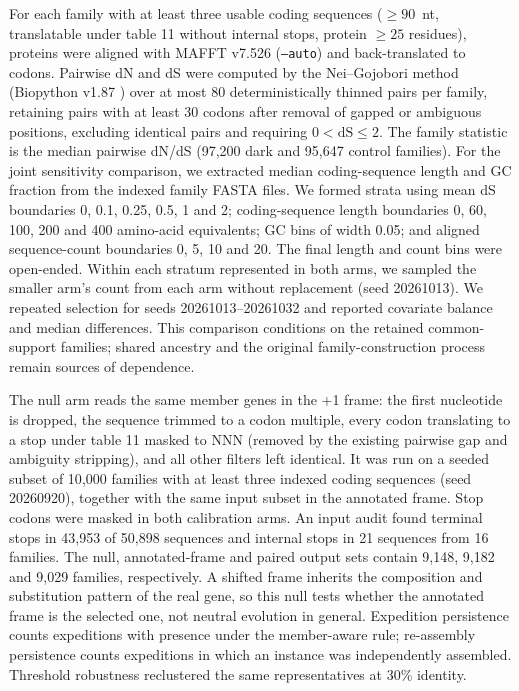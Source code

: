 \documentclass[11pt]{article}
\begin{document}
For each family with at least three usable coding sequences ($\geq 90$~nt, translatable under table
11 without internal stops, protein $\geq 25$ residues), proteins were aligned with MAFFT v7.526
(\texttt{--auto}) \citep{katoh2013mafft} and back-translated to codons. Pairwise dN and dS were computed
by the Nei--Gojobori method \citep{nei1986dnds} (Biopython v1.87 \citep{cock2009biopython}) over at most
80 deterministically thinned pairs per family, retaining pairs with at least 30 codons after removal
of gapped or ambiguous positions, excluding identical pairs and requiring $0 < \mathrm{dS} \leq 2$.
The family statistic is the median pairwise dN/dS (97{,}200 dark and 95{,}647 control families).
For the joint sensitivity comparison, we extracted median coding-sequence length and GC
fraction from the indexed family FASTA files. We formed strata using mean dS boundaries
0, 0.1, 0.25, 0.5, 1 and 2; coding-sequence length boundaries 0, 60, 100, 200 and 400 amino-acid
equivalents; GC bins of width 0.05; and aligned sequence-count boundaries 0, 5, 10 and 20.
The final length and count bins were open-ended. Within each stratum represented in both arms,
we sampled the smaller arm's count from each arm without replacement (seed 20261013).
We repeated selection for seeds 20261013--20261032 and reported covariate balance and median
differences. This comparison conditions on the retained common-support families; shared ancestry
and the original family-construction process remain sources of dependence.

The null arm reads the same member genes in the +1 frame: the first nucleotide is dropped, the
sequence trimmed to a codon multiple, every codon translating to a stop under table 11 masked to NNN
(removed by the existing pairwise gap and ambiguity stripping), and all other filters left identical.
It was run on a seeded subset of 10{,}000 families with at least three indexed coding
sequences (seed 20260920), together with the same input subset in the annotated frame. Stop
codons were masked in both calibration arms. An input audit found terminal stops in 43{,}953 of
50{,}898 sequences and internal stops in 21 sequences from 16 families. The null, annotated-frame and paired output sets
contain 9{,}148, 9{,}182 and 9{,}029 families, respectively. A shifted frame inherits the composition and
substitution pattern of the real gene, so this null tests whether the annotated frame is the selected
one, not neutral evolution in general. Expedition persistence counts
expeditions with presence under the member-aware rule; re-assembly persistence counts expeditions in
which an instance was independently assembled. Threshold robustness reclustered the same
representatives at 30\% identity.
\end{document}
